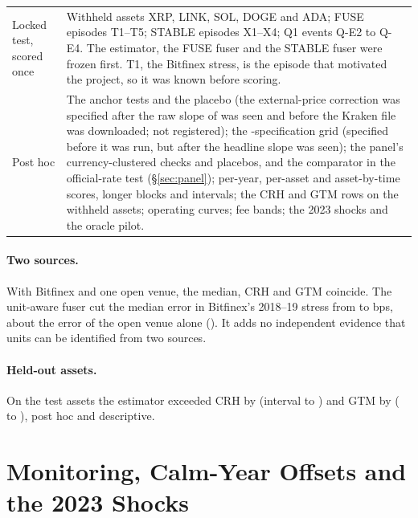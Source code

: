 \documentclass[sigconf,review,anonymous]{acmart}
\begin{document}
\begin{table}[!tb]
\begin{tabular}{@{}lp{}@{}}
Locked test, scored once & Withheld assets XRP, LINK, SOL, DOGE and ADA; FUSE episodes T1--T5; STABLE episodes X1--X4; Q1 events Q-E2 to Q-E4.
The estimator, the FUSE fuser and the STABLE fuser were frozen first. T1, the Bitfinex stress, is the episode that
motivated the project, so it was known before scoring. \\
Post hoc & The anchor tests and the placebo (the external-price correction was specified after the raw slope of
\NumKStressDaySlopeD{} was seen and before the Kraken file was downloaded; not registered); the \NumRACells{}-specification
grid (specified before it was run, but after the headline slope was seen); the panel's currency-clustered checks and placebos, and the comparator in the official-rate test (\S\ref{sec:panel}); per-year, per-asset and asset-by-time scores, longer blocks and intervals; the CRH and
GTM rows on the withheld assets; operating curves; fee bands; the 2023 shocks and the oracle pilot. \\
\bottomrule
\end{tabular}
\end{table}

\paragraph{Two sources.} With Bitfinex and one open venue, the median, CRH and GTM coincide. The unit-aware fuser cut the median error in Bitfinex's 2018--19 stress from
\NumTAllBothStressBfxTwentyEighteenNineteenMedianMed{} to \NumTAllBothStressBfxTwentyEighteenNineteenUnitAwareMed{} bps, about the error of the open venue alone (\NumTAllBothStressBfxTwentyEighteenNineteenOpenOnlyMed{}). It adds no independent evidence that units can be identified from two sources.

\paragraph{Held-out assets.} On the test assets the estimator exceeded CRH by \NumTPartTestEstMinusCrh{} (interval \NumTPartTestEstMinusCrhLo{} to \NumTPartTestEstMinusCrhHi{}) and GTM by \NumTPartTestEstMinusGtm{} (\NumTPartTestEstMinusGtmLo{} to \NumTPartTestEstMinusGtmHi{}), post hoc and descriptive.

\section{Monitoring, Calm-Year Offsets and the 2023 Shocks}
\label{app:monitor}
\end{document}
